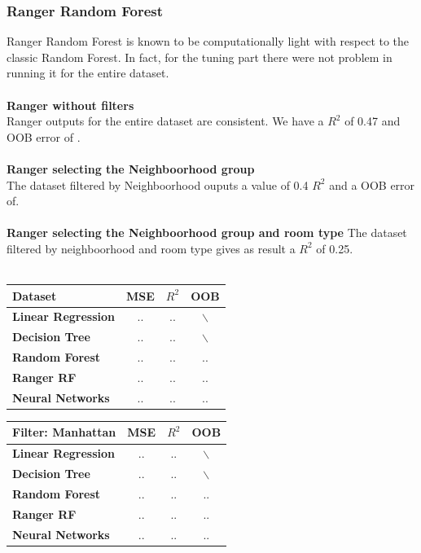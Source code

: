 \documentclass{FR16}
\begin{document}
\subsubsection{Ranger Random Forest}
Ranger Random Forest is known to be computationally light with respect to the classic Random Forest. In fact, for the tuning part there were not problem in running it for the entire dataset. 
\\\\ \textbf{Ranger without filters}\\
Ranger outputs for the entire dataset are consistent. We have a $R^2$ of 0.47 and OOB error of .
\\\\
\textbf{Ranger selecting the Neighboorhood group}\\
The dataset filtered by Neighboorhood ouputs a value of 0.4 $R^2$ and a OOB error of.
\\\\ 
\textbf{Ranger selecting the Neighboorhood group and room type}
The dataset filtered by neighboorhood and room type gives as result a $R^2$ of 0.25.
\\\\
\begin{center}
\begin{tabular}{l c c c }
\arrayrulecolor{Azzurro}
\hline
{\bfseries Dataset
} & MSE & $R^2$ & OOB \\
\hline
{\bfseries Linear Regression} & .. & .. & $\backslash$ \\
{\bfseries Decision Tree} & .. & .. & $\backslash$ \\
{\bfseries Random Forest} & .. & .. & .. \\
{\bfseries Ranger RF} & .. & .. & .. \\
{\bfseries Neural Networks} & .. & .. & .. \\
\hline
\end{tabular}
\end{center}

\begin{center}
\begin{tabular}{l c c c }
\arrayrulecolor{Azzurro}
\hline
{\bfseries Filter: Manhattan
} & MSE & $R^2$ & OOB \\
\hline
{\bfseries Linear Regression} & .. & .. & $\backslash$ \\
{\bfseries Decision Tree} & .. & .. & $\backslash$ \\
{\bfseries Random Forest} & .. & .. & .. \\
{\bfseries Ranger RF} & .. & .. & .. \\
{\bfseries Neural Networks} & .. & .. & .. \\
\hline
\end{tabular}
\end{center}
\end{document}
